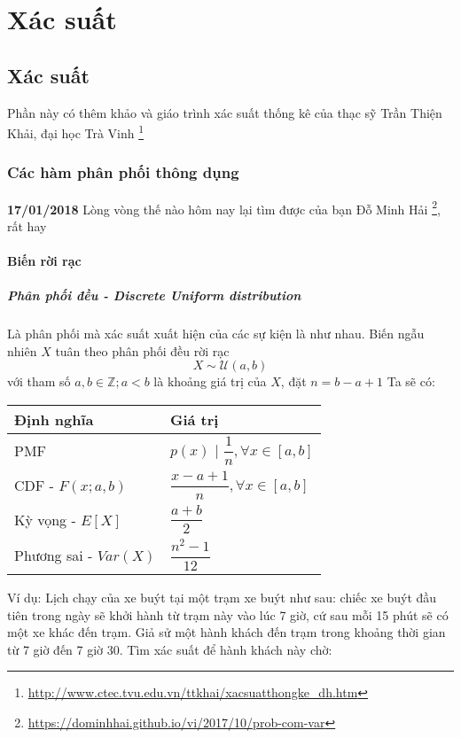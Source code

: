 \part{Xác suất}
\chapter{Xác suất}

Phần này có thêm khảo \cite{Goodfellow-et-al-2016} và giáo trình xác suất thống kê của thạc sỹ Trần Thiện Khải, đại học Trà Vinh  \footnote{\href{http://www.ctec.tvu.edu.vn/ttkhai/xacsuatthongke_dh.htm}{http://www.ctec.tvu.edu.vn/ttkhai/xacsuatthongke\_dh.htm}}

\section{Các hàm phân phối thông dụng}

\textbf{17/01/2018} Lòng vòng thế nào hôm nay lại tìm được của bạn Đỗ Minh Hải \footnote{\href{https://dominhhai.github.io/vi/2017/10/prob-com-var}{https://dominhhai.github.io/vi/2017/10/prob-com-var}}, rất hay

\subsection{Biến rời rạc}

\subsubsection{Phân phối đều - Discrete Uniform distribution}

Là phân phối mà xác suất xuất hiện của các sự kiện là như nhau.
\newline
Biến ngẫu nhiên $X$ tuân theo phân phối đều rời rạc
$$X \sim \mathcal{U} (a, b)$$
với tham số $a, b \in \mathbb Z; a < b$ là khoảng giá trị của $X$, đặt $n = b-a+1$
\newline
Ta sẽ có:
\newline
\begin{tabular}{ | l | l | }
  \hline
  Định nghĩa & Giá trị \\
  \hline
  PMF & $p(x)$ | $\dfrac{1}{n}, \forall x \in [a,b]$ \\
  \hline
  CDF - $F(x;a,b)$ & $\dfrac{x-a+1}{n}, \forall x \in [a,b]$ \\
  \hline
  Kỳ vọng - $E[X]$ & $\dfrac{a+b}{2}$ \\
  \hline
  Phương sai - $Var(X)$ & $\dfrac{n^2-1}{12}$ \\
  \hline
\end{tabular}
\newline
Ví dụ: Lịch chạy của xe buýt tại một trạm xe buýt như sau: chiếc xe buýt đầu tiên trong ngày sẽ khởi hành từ trạm này vào lúc 7 giờ, cứ sau mỗi 15 phút sẽ có một xe khác đến trạm. Giả sử một hành khách đến trạm trong khoảng thời gian từ 7 giờ đến 7 giờ 30. Tìm xác suất để hành khách này chờ:

